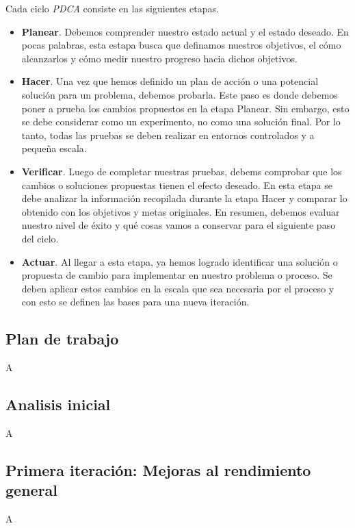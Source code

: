 Cada ciclo \textit{PDCA} consiste en las siguientes etapas.

\begin{itemize}
    \item \textbf{Planear}. Debemos comprender nuestro estado actual y el estado deseado. En pocas palabras, esta estapa busca que definamos nuestros objetivos, el cómo alcanzarlos y cómo medir nuestro progreso hacia dichos objetivos.
    \item \textbf{Hacer}. Una vez que hemos definido un plan de acción o una potencial solución para un problema, debemos probarla. Este paso es donde debemos poner a prueba los cambios propuestos en la etapa Planear. Sin embargo, esto se debe considerar como un experimento, no como una solución final. Por lo tanto, todas las pruebas se deben realizar en entornos controlados y a pequeña escala.
    \item \textbf{Verificar}. Luego de completar nuestras pruebas, debems comprobar que los cambios o soluciones propuestas tienen el efecto deseado. En esta etapa se debe analizar la información recopilada durante la etapa Hacer y comparar lo obtenido con los objetivos y metas originales. En resumen, debemos evaluar nuestro nivel de éxito y qué cosas vamos a conservar para el siguiente paso del ciclo.
    \item \textbf{Actuar}. Al llegar a esta etapa, ya hemos logrado identificar una solución o propuesta de cambio para implementar en nuestro problema o proceso. Se deben aplicar estos cambios en la escala que sea necesaria por el proceso y con esto se definen las bases para una nueva iteración.
\end{itemize}

\subsection{Plan de trabajo}

A

\subsection{Analisis inicial}

A

\subsection{Primera iteración: Mejoras al rendimiento general}

A

